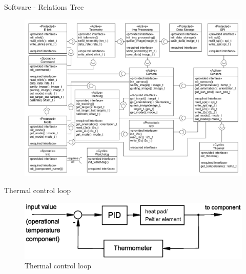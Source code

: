 \documentclass[11pt, aspectratio=169]{beamer}
\begin{document}
\begin{frame}[c]{Software - Relations Tree}
    \begin{figure}
        \includegraphics[height=.9\textheight]{software/complete_relations_tree.png}
    \end{figure}
\end{frame}

\begin{frame}[c]{Thermal control loop}
    \begin{figure}
        \includegraphics[width=\textwidth]{figures/images/Thermal_control.eps}
        \caption*{Thermal control loop}
    \end{figure}
\end{frame}
\end{document}
